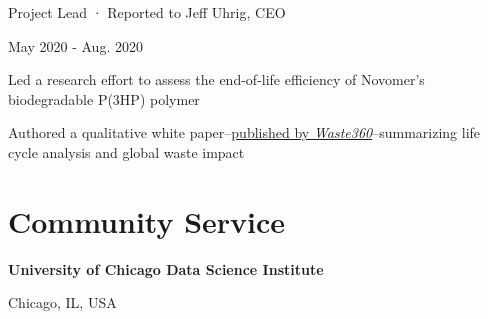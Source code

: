     \begin{minipage}{.75\linewidth} \begin{flushleft}
    		Project Lead · Reported to Jeff Uhrig, CEO
    	\end{flushleft} \end{minipage}
    \hfill 
    \begin{minipage}{.20\linewidth}\begin{flushright}
    	 May 2020 - Aug. 2020
    	\end{flushright}\end{minipage}
        \vspace{-5pt}
	\begin{description}[font=$\bullet$]
        \item{Led a research effort to assess the end-of-life efficiency of Novomer’s biodegradable P(3HP) polymer}
        \vspace{-6pt}
        \item{Authored a qualitative white paper--\href{https://www.waste360.com/plastics/economic-environmental-impacts-poly3-hydroxyproprionate}{published by \textit{Waste360}}--summarizing life cycle analysis and global waste impact} 
	\end{description}














\vspace{-5pt}
\section{Community Service}
    \begin{minipage}{.75\linewidth} \begin{flushleft}
    		\textbf{University of Chicago Data Science Institute}
    	\end{flushleft} \end{minipage}
    \hfill 
    \begin{minipage}{.20\linewidth}\begin{flushright}
    	 Chicago, IL, USA
    	\end{flushright}\end{minipage}
     
